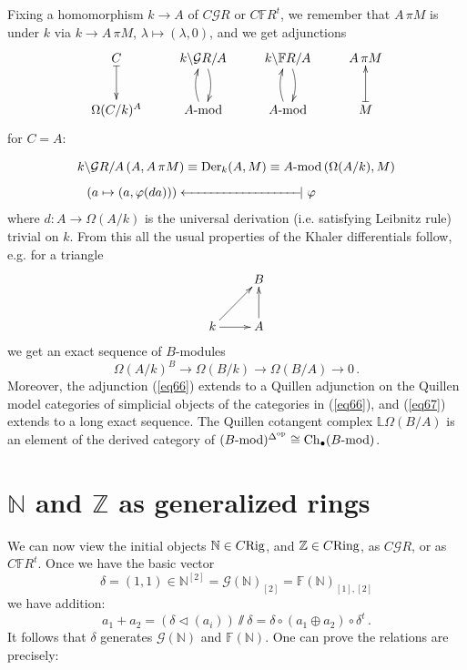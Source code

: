 \documentclass[leqno]{article}
\numberwithin{equation}{section}
\begin{document}
\medskip

Fixing a homomorphism $k \to A$ of $C{\mathcal G} R$ or $C{\mathbb F} R^t$, we remember that $A \, \pi M$ is under $k$ via $k \to A \, \pi M$, $\lambda \mapsto (\lambda , 0)$, and we get adjunctions
\begin{equation}
\label{eq66}
\xymatrix{
C \ar@{|->}[d] &k \backslash {\mathcal G} R / A \ar@/^/[d] &k \backslash {\mathbb F} R / A \ar@/^/[d] &A \, \pi M \\
\Omega (C/k)^A  &\mbox{$A$-mod}\ar@/^/[u] &\mbox{$A$-mod} \ar@/^/[u] &M \ar@{|->}[u]
}
\end{equation}
for $C=A$:

$$
k \backslash {\mathcal G} R / A \, (A , A \, \pi M) \equiv {\rm Der}_k (A,M) \equiv \mbox{$A$-mod} \, (\Omega (A/k) , M)
$$
$$
\mbox{\hglue -20mm} \left( a \mapsto (a,\varphi (da)) \right) \leftarrow\!\!\!-\!\!\!-\!\!\!-\!\!\!-\!\!\!-\!\!\!-\!\!\!-\!\!\!-\!\!\!-\!\!\!-\!\!\!-\!\!\!-\!\!\!-\!\!\!-\!\!\!-\!\!\!-\!\!\!-\!| \ \varphi
$$
where $d : A \to \Omega (A/k)$ is the universal derivation (i.e. satisfying Leibnitz rule) trivial on $k$. From this all the usual properties of the Khaler differentials follow, e.g. for a triangle
$$
\xymatrix{
&B \\
k \ar[ur] \ar[r] &A \ar[u]
}
$$
we get an exact sequence of $B$-modules
\begin{equation}
\label{eq67}
\Omega (A/k)^B \to \Omega (B/k) \to \Omega (B/A) \to 0 \, .
\end{equation}
Moreover, the adjunction (\ref{eq66}) extends to a Quillen adjunction on the Quillen model categories of simplicial objects of the categories in (\ref{eq66}), and (\ref{eq67}) extends to a long exact sequence. The Quillen cotangent complex ${\mathbb L} \Omega (B/A)$ is an element of the derived category of $(\mbox{$B$-mod})^{\Delta^{\rm op}} \cong {\rm Ch}_{\bullet} (\mbox{$B$-mod})$.


\section{${\mathbb N}$ and ${\mathbb Z}$ as generalized rings}

We can now view the initial objects ${\mathbb N} \in C{\rm Rig}$, and ${\mathbb Z} \in C{\rm Ring}$, as $C{\mathcal G} R$, or as $C{\mathbb F} R^t$. Once we have the basic vector
$$
\delta = (1,1) \in {\mathbb N}^{[2]} = {\mathcal G} ({\mathbb N})_{[2]} = {\mathbb F} ({\mathbb N})_{[1],[2]}
$$
we have addition:
$$
a_1 + a_2 = (\delta \lhd (a_i)) \sslash \delta = \delta \circ (a_1 \oplus a_2) \circ \delta^t \, .
$$
It follows that $\delta$ generates ${\mathcal G} ({\mathbb N})$ and ${\mathbb F} ({\mathbb N})$. One can prove the relations are precisely:
\end{document}
